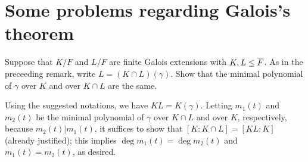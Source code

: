 \section{Some problems regarding Galois's theorem}

\begin{prob}\label{gapped_proof: Galois's_thm}
    Suppose that $K/F$ and $L/F$ are finite Galois extensions with $K, L\leq \overline{F}$.
    As in the preceeding remark, write $L=(K\cap L)(\gamma)$.
    Show that the minimal polynomial of $\gamma$ over $K$ and over $K\cap L$ are the same.
\end{prob}
\begin{sol}
    Using the suggested notations, we have $KL=K(\gamma)$.
    Letting $m_1(t)$ and $m_2(t)$ be the minimal polynomial of $\gamma$ over $K\cap L$ and over $K$, respectively, because $m_2(t)|m_1(t)$, it suffices to show that $[K:K\cap L]=[KL:K]$ (already justified); this implies $\deg m_1(t)=\deg m_2(t)$ and $m_1(t)=m_2(t)$, as desired.
\end{sol}

